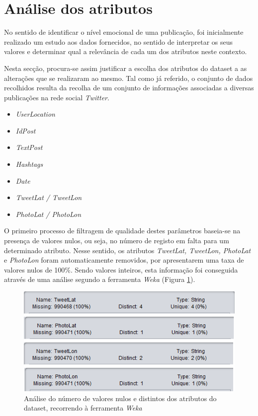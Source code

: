 \section{Análise dos atributos}
\label{sec:AnaliseAtributos}

No sentido de identificar o nível emocional de uma publicação, foi inicialmente realizado um estudo aos dados fornecidos, no sentido de interpretar os seus valores e determinar qual a relevância de cada um dos atributos neste contexto.

Nesta secção, procura-se assim justificar a escolha dos atributos do dataset a as alterações que se realizaram ao mesmo. 
Tal como já referido, o conjunto de dados recolhidos resulta da recolha de um conjunto de informações associadas a diversas publicações na rede social \textit{Twitter}. 

\begin{multicols}{2}
\begin{itemize}
    \item \textit{UserLocation}
    \item \textit{IdPost}
    \item \textit{TextPost}
    \item \textit{Hashtags}
    \item \textit{Date}
    \item \textit{TweetLat / TweetLon}
    \item \textit{PhotoLat / PhotoLon}
\end{itemize}
\end{multicols}

O primeiro processo de filtragem de qualidade destes parâmetros baseia-se na presença de valores nulos, ou seja, no número de registo em falta para um determinado atributo. 
Nesse sentido, os atributos \textit{TweetLat, TweetLon, PhotoLat} e \textit{PhotoLon} foram automaticamente removidos, por apresentarem uma taxa de valores nulos de 100\%. 
Sendo valores inteiros, esta informação foi conseguida através de uma análise segundo a ferramenta \textit{Weka} (Figura \ref{fig:analiseWeka}).  

\begin{figure}[t]
    \centering
    \includegraphics[scale=1]{Imagens/weka1.png}
    \caption{Análise do número de valores nulos e distintos dos atributos do dataset, recorrendo à ferramenta \textit{Weka}}
    \label{fig:analiseWeka}
\end{figure}

